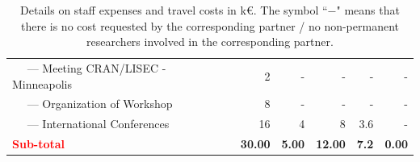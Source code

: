 \documentclass[a4paper,11pt]{article}
\begin{document}
\begin{table}[h!]
\begin{center}
\begin{tabular}{p{6cm}rrrrr}
~~ --- Meeting CRAN/LISEC - Minneapolis& 2\phantom{.000} & - \phantom{.000} & - \phantom{.000} & - \phantom{.000} & - \phantom{.000} \\
~~ --- Organization of Workshop& 8\phantom{.000} & - \phantom{.000} & - \phantom{.000} & - \phantom{.000} & - \phantom{.000} \\ 
~~ --- International Conferences & 16\phantom{.000} & 4\phantom{.000} & 8\phantom{.000} & 3.6\phantom{.000} &- \phantom{.000} \\ 
\hline
\textcolor{red}{\bf Sub-total} & \bf 30.00 \! & \bf 5.00\! & \bf 12.00\! &\bf  7.2\! & \bf 0.00\\ \hline
 \hline
\end{tabular} 
\vspace{-0.3cm}
\caption{Details on staff expenses and travel costs in k\euro. The symbol ``$-$" means that there is no cost requested by the corresponding partner / no non-permanent researchers involved in the corresponding partner.}\label{tab:euro}
\end{center}
\end{table}
\end{document}
